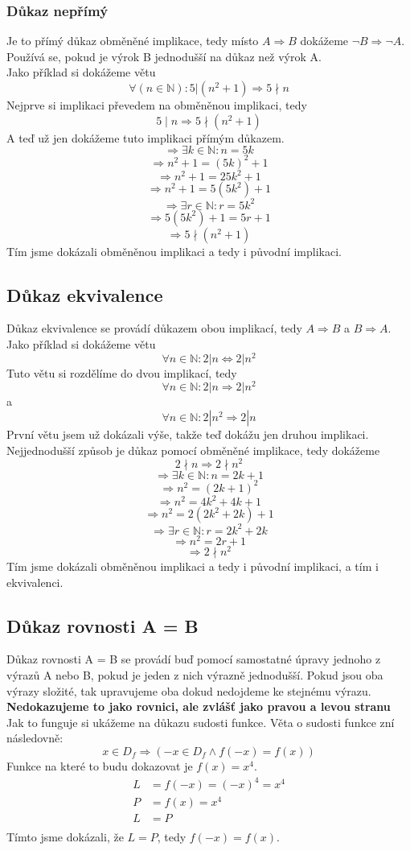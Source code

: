 \documentclass[12pt]{article}
\begin{document}
\subsubsection*{Důkaz nepřímý}
Je to přímý důkaz obměněné implikace, tedy místo $A \Rightarrow B$ dokážeme $\neg B \Rightarrow \neg A$.\\
Používá se, pokud je výrok B jednodušší na důkaz než výrok A.\\
Jako příklad si dokážeme větu \[\forall(n\in \mathbb{N}): 5|(n^2+1) \Rightarrow 5\nmid n\]
Nejprve si implikaci převedem na obměněnou implikaci, tedy \[5 \mid n \Rightarrow 5\nmid (n^2+1)\]
A teď už jen dokážeme tuto implikaci přímým důkazem.
\[\Rightarrow \exists k \in \mathbb{N}: n = 5k\]
\[\Rightarrow n^2 + 1 = (5k)^2 + 1\]
\[\Rightarrow n^2 + 1 = 25k^2 + 1\]
\[\Rightarrow n^2 + 1 = 5(5k^2) + 1\]
\[\Rightarrow \exists r \in \mathbb{N}: r = 5k^2\]
\[\Rightarrow 5(5k^2) + 1 = 5r + 1\]
\[\Rightarrow 5 \nmid (n^2 + 1)\]
Tím jsme dokázali obměněnou implikaci a tedy i původní implikaci.

\subsection*{Důkaz ekvivalence}
Důkaz ekvivalence se provádí důkazem obou implikací, tedy $A \Rightarrow B$ a $B \Rightarrow A$.\\
Jako příklad si dokážeme větu \[\forall n \in \mathbb{N}: 2|n \Leftrightarrow 2|n^2\]
Tuto větu si rozdělíme do dvou implikací, tedy \[\forall n \in \mathbb{N}: 2|n \Rightarrow 2|n^2\] a \[\forall n \in \mathbb{N}: 2|n^2 \Rightarrow 2|n\]
První větu jsem už dokázali výše, takže teď dokážu jen druhou implikaci. Nejjednodušší způsob je důkaz pomocí obměněné implikace, tedy dokážeme \[2\nmid n \Rightarrow 2\nmid n^2\]
\[\Rightarrow \exists k \in \mathbb{N}: n = 2k + 1\]
\[\Rightarrow n^2 = (2k + 1)^2\]
\[\Rightarrow n^2 = 4k^2 + 4k + 1\]
\[\Rightarrow n^2 = 2(2k^2 + 2k) + 1\]
\[\Rightarrow \exists r \in \mathbb{N}: r = 2k^2 + 2k\]
\[\Rightarrow n^2 = 2r + 1\]
\[\Rightarrow 2 \nmid n^2\]
Tím jsme dokázali obměněnou implikaci a tedy i původní implikaci, a tím i ekvivalenci.

\subsection*{Důkaz rovnosti A = B}
Důkaz rovnosti A = B se provádí buď pomocí samostatné úpravy jednoho z výrazů A nebo B, pokud je jeden z nich výrazně jednodušší. Pokud jsou oba výrazy složité, tak upravujeme oba dokud nedojdeme ke stejnému výrazu. \textbf{Nedokazujeme to jako rovnici, ale zvlášť jako pravou a levou stranu}
Jak to funguje si ukážeme na důkazu sudosti funkce. Věta o sudosti funkce zní následovně: \[x\in D_f \Rightarrow (-x\in D_f \land f(-x) = f(x))\]
Funkce na které to budu dokazovat je $f(x) = x^4$.
\begin{align*}
L &= f(-x) = (-x)^4 = x^4\\
P &= f(x) = x^4\\
L &= P\\
\end{align*}
Tímto jsme dokázali, že $L = P$, tedy $f(-x) = f(x)$.
\end{document}
